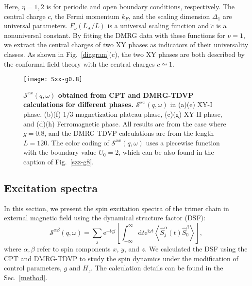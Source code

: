 \documentclass[aps,prx,showpacs,floatfix,twocolumn,superscriptaddress,nofootinbib,longbibliography]{revtex4-2}
\begin{document}
Here, $\eta=1,2$ is for periodic and open boundary conditions, respectively. The  central charge
$c$, the Fermi momentum $k_F$, and the scaling dimension $\Delta_1$ are universal parameters. $F_{\nu} (L_\mathrm{A}/L) $ is a universal scaling function and $\tilde{c}$ is a nonuniversal constant. By fitting the DMRG data with these functions for $\nu =1$,   we extract the central charges of two XY phases as indicators of their universality classes. As shown in Fig.~\ref{diagram}(c), the two XY phases are both described by the conformal field theory with the central charges $c\simeq 1$. 





\begin{figure*}[t]
	\texttt{[image: Sxx-g0.8]}
	\caption{\label{sxx-g8} \textbf{$\mathcal{S}^{xx}  (q,\omega) $  obtained from CPT and DMRG-TDVP calculations for different phases.}  $\mathcal{S}^{xx}  (q,\omega) $ in  (a)(e) XY-I phase, (b)(f) $1/3 $ magnetization  plateau phase, (c)(g) XY-II phase, and (d)(h) Ferromagnetic phase. All results are from the case where $g=0.8$, and the DMRG-TDVP calculations are from the length $L=120$. The  color coding of $\mathcal{S}^{xx} (q,\omega)$ uses a piecewise function with the boundary value $U_0=2$, which can be also found in the caption of Fig.~\ref{szz-g8}. }
\end{figure*}



\subsection{Excitation spectra}

In this section, we present the spin excitation spectra of the trimer chain in external magnetic field using the dynamical structure factor (DSF):
\begin{equation}
\mathcal{S}^{\alpha \beta}(q, \omega)=\sum_j \mathrm{e}^{-\mathrm{i} q j}\left[\int_{-\infty}^{\infty} \mathrm{d} t \mathrm{e}^{\mathrm{i} \omega t}\left\langle\hat{S}_j^\alpha(t) \hat{S}_0^\beta\right\rangle\right],
\end{equation}
where $\alpha,\beta$ refer to spin components $x$, $y$, and $z$. We calculated the DSF using the CPT and DMRG-TDVP to study the spin dynamics under the modification of control parameters, $g$ and $H_z$. The calculation details can be found in the Sec.~\ref{method}.
\end{document}
